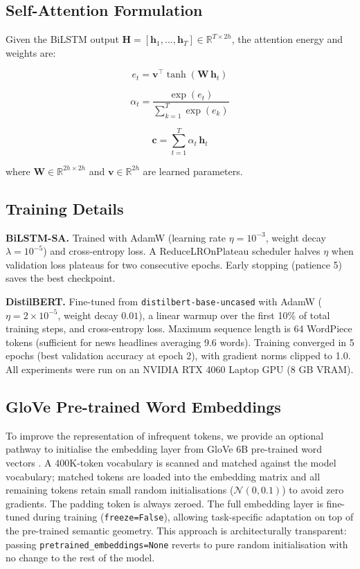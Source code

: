 \documentclass[conference]{IEEEtran}
\begin{document}
\subsection{Self-Attention Formulation}
Given the BiLSTM output $\mathbf{H} = [\mathbf{h}_1, \ldots, \mathbf{h}_T]
\in \mathbb{R}^{T \times 2h}$, the attention energy and weights are:

\begin{equation}
  e_t = \mathbf{v}^\top \tanh(\mathbf{W}\,\mathbf{h}_t)
  \label{eq:energy}
\end{equation}

\begin{equation}
  \alpha_t = \frac{\exp(e_t)}{\sum_{k=1}^{T} \exp(e_k)}
  \label{eq:attn}
\end{equation}

\begin{equation}
  \mathbf{c} = \sum_{t=1}^{T} \alpha_t\,\mathbf{h}_t
  \label{eq:context}
\end{equation}

where $\mathbf{W} \in \mathbb{R}^{2h \times 2h}$ and
$\mathbf{v} \in \mathbb{R}^{2h}$ are learned parameters.

\subsection{Training Details}

\textbf{BiLSTM-SA.} Trained with AdamW \cite{loshchilov2019adamw}
(learning rate $\eta = 10^{-3}$, weight decay $\lambda = 10^{-5}$)
and cross-entropy loss. A ReduceLROnPlateau scheduler halves $\eta$
when validation loss plateaus for two consecutive epochs. Early
stopping (patience 5) saves the best checkpoint.

\textbf{DistilBERT.} Fine-tuned from \texttt{distilbert-base-uncased}
with AdamW ($\eta = 2 \times 10^{-5}$, weight decay $0.01$), a linear
warmup over the first 10\% of total training steps, and cross-entropy
loss. Maximum sequence length is 64 WordPiece tokens (sufficient for
news headlines averaging 9.6 words). Training converged in 5 epochs
(best validation accuracy at epoch 2), with gradient norms clipped to
1.0. All experiments were run on an NVIDIA RTX 4060 Laptop GPU (8 GB VRAM).

\subsection{GloVe Pre-trained Word Embeddings}
\label{subsec:glove}
To improve the representation of infrequent tokens, we provide an
optional pathway to initialise the embedding layer from GloVe 6B
pre-trained word vectors \cite{pennington2014glove}. A 400K-token
vocabulary is scanned and matched against the model vocabulary; matched
tokens are loaded into the embedding matrix and all remaining tokens
retain small random initialisations ($\mathcal{N}(0, 0.1)$) to avoid
zero gradients. The padding token is always zeroed. The full embedding
layer is fine-tuned during training (\texttt{freeze=False}), allowing
task-specific adaptation on top of the pre-trained semantic geometry.
This approach is architecturally transparent: passing
\texttt{pretrained\_embeddings=None} reverts to pure random
initialisation with no change to the rest of the model.
\end{document}
